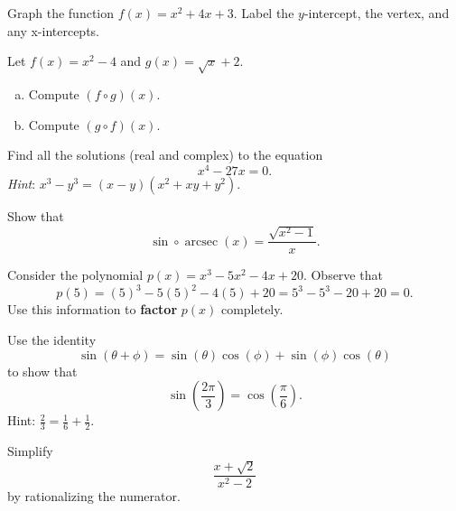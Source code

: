 \documentclass[12pt]{amsart}
\begin{document}
\newpage

\begin{thm}[4 Points]
	Graph the function $f(x) = x^2 + 4x + 3$.
	Label the $y$-intercept, the vertex, and any x-intercepts.
	\vspace{3.5in}
\end{thm}

\newpage

\begin{thm}[2 Points]\label{ex3}
  Let $f(x) = x^2 - 4$ and $g(x) = \sqrt{x} + 2$.
  \begin{enumerate}[(a)]
  \item
    Compute $(f \circ g)(x)$.
    \vspace{4in}
  \item
    Compute $(g \circ f)(x)$.
  \end{enumerate}
\end{thm}

\newpage

\begin{thm}[10 Points]
	Find all the solutions (real and complex) to the equation 
	$$x^4 - 27x = 0.$$
        {\it Hint}: $x^3 - y^3 = (x - y)(x^2 + xy + y^2)$.
	\vspace{3in}
\end{thm}

\newpage

\begin{thm}[10 Points]
  Show that
  $$\sin \circ \operatorname{arcsec}(x) = \frac{\sqrt{x^2 - 1}}{x}.$$
\end{thm}

\newpage

\begin{thm}[10 Points]
	Consider the polynomial $p(x) = x^3 - 5x^2 - 4x + 20$.
	Observe that 
	$$p(5) = (5)^3 - 5(5)^2 - 4(5) + 20 = 5^3 - 5^3 - 20 + 20 = 0.$$
	Use this information to {\bf factor} $p(x)$ completely.
	\vspace{3.5in}
\end{thm}

\newpage

\begin{thm}[4 Points]
	Use the identity
        $$\sin(\theta + \phi) = \sin(\theta)\cos(\phi) + \sin(\phi)\cos(\theta)$$
	to show that
	$$\sin\left(\frac{2\pi}{3}\right) = \cos\left(\frac{\pi}{6}\right).$$
        Hint: $\frac{2}{3} = \frac{1}{6} + \frac{1}{2}.$
\end{thm}

\newpage

\begin{thm}[5 Points]
	Simplify 
	$$\frac{x + \sqrt{2}}{x^2 - 2}$$
	by rationalizing the numerator.
	\vspace{3in}
\end{thm}
\end{document}
